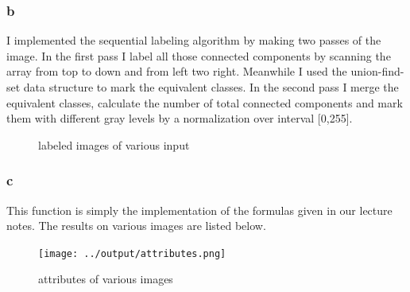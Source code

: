 \documentclass[12pt,letterpaper]{article}
\begin{document}
\subsubsection*{b}
I implemented the sequential labeling algorithm by making two passes of the image.
In the first pass I label all those connected components by scanning the array from
top to down and from left two right. 
Meanwhile I used the union-find-set data structure to mark the equivalent classes.
In the second pass I merge the equivalent classes, calculate the number of total connected components 
and mark them with different gray levels by a normalization over interval [0,255].
\begin{figure}[htbp]
  \centering
  \caption{labeled images of various input}
  \label{labeled_img}
\end{figure}

\subsubsection*{c}
This function is simply the implementation of the formulas given in our lecture notes.
The results on various images are listed below. 
\begin{figure}[htbp]
  \centering
  \texttt{[image: ../output/attributes.png]}
  \label{att}
  \caption{attributes of various images}
\end{figure}
\end{document}
